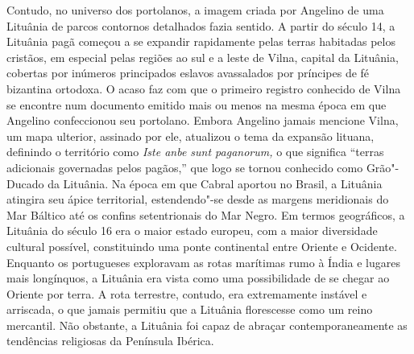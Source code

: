 Contudo, no universo dos portolanos, a imagem criada por Angelino de uma
Lituânia de parcos contornos detalhados fazia sentido. A partir do
século 14, a Lituânia pagã começou a se expandir rapidamente pelas
terras habitadas pelos cristãos, em especial pelas regiões ao sul e a
leste de Vilna, capital da Lituânia, cobertas por inúmeros principados
eslavos avassalados por príncipes de fé bizantina ortodoxa. O acaso faz
com que o primeiro registro conhecido de Vilna se encontre num documento
emitido mais ou menos na mesma época em que Angelino confeccionou seu
portolano. Embora Angelino jamais mencione Vilna, um mapa ulterior,
assinado por ele, atualizou o tema da expansão lituana, definindo o
território como \emph{Iste anbe sunt paganorum,} o que significa
``terras adicionais governadas pelos pagãos,'' que logo se tornou
conhecido como Grão"-Ducado da Lituânia. Na época em que Cabral aportou
no Brasil, a Lituânia atingira seu ápice territorial, estendendo"-se
desde as margens meridionais do Mar Báltico até os confins setentrionais
do Mar Negro. Em termos geográficos, a Lituânia do século 16 era o maior
estado europeu, com a maior diversidade cultural possível, constituindo
uma ponte continental entre Oriente e Ocidente. Enquanto os portugueses
exploravam as rotas marítimas rumo à Índia e lugares mais longínquos, a
Lituânia era vista como uma possibilidade de se chegar ao Oriente por
terra. A rota terrestre, contudo, era extremamente instável e arriscada,
o que jamais permitiu que a Lituânia florescesse como um reino
mercantil. Não obstante, a Lituânia foi capaz de abraçar
contemporaneamente as tendências religiosas da Península Ibérica.

